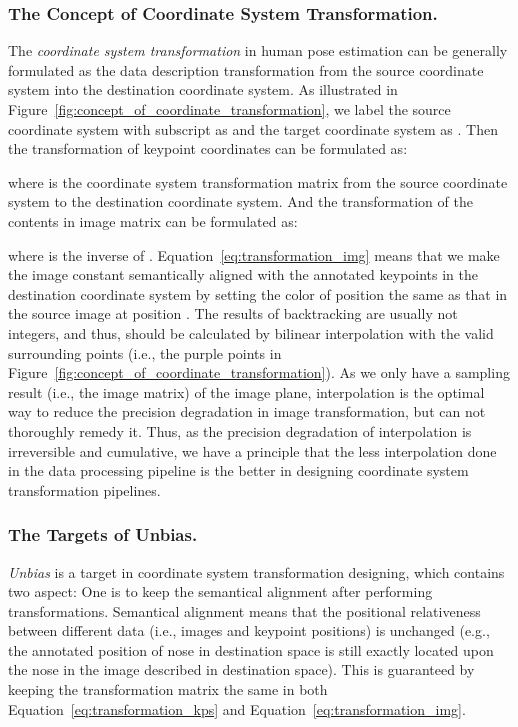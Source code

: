 \documentclass[10pt,journal,compsoc]{IEEEtran}
\begin{document}
\subsubsection{The Concept of Coordinate System Transformation.}
The \textit{coordinate system transformation} in human pose estimation can be generally formulated as the data description transformation from the source coordinate system into the destination coordinate system. As illustrated in Figure~\ref{fig:concept_of_coordinate_transformation}, we label the source coordinate system with subscript  as  and the target coordinate system as . Then the transformation of keypoint coordinates can be formulated as:

where  is the coordinate system transformation matrix from the source coordinate system to the destination coordinate system. And the transformation of the contents in image matrix can be formulated as:

where  is the inverse of . Equation~\ref{eq:transformation_img} means that we make the image constant semantically aligned with the annotated keypoints in the destination coordinate system by setting the color of position  the same as that in the source image at position . The results of backtracking  are usually not integers, and thus,  should be calculated by bilinear interpolation with the valid surrounding points (i.e., the purple points in Figure~\ref{fig:concept_of_coordinate_transformation}). As we only have a sampling result (i.e., the image matrix) of the image plane, interpolation is the optimal way to reduce the precision degradation in image transformation, but can not thoroughly remedy it. Thus, as the precision degradation of interpolation is irreversible and cumulative, we have a principle that the less interpolation done in the data processing pipeline is the better in designing coordinate system transformation pipelines.

\subsubsection{The Targets of Unbias.}
\textit{Unbias} is a target in coordinate system transformation designing, which contains two aspect: One is to keep the semantical alignment after performing transformations. Semantical alignment means that the positional relativeness  between different data (i.e., images and keypoint positions) is unchanged (e.g., the annotated position of nose in destination space is still exactly located upon the nose in the image described in destination space). This is guaranteed by keeping the transformation matrix the same in both Equation~\ref{eq:transformation_kps} and Equation~\ref{eq:transformation_img}.
\end{document}
